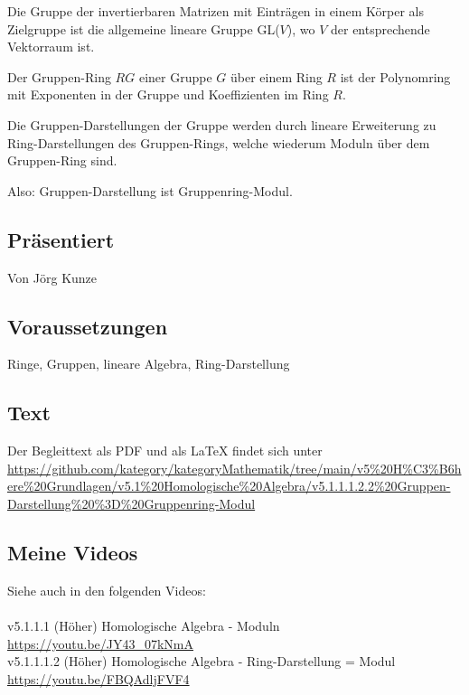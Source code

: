 \documentclass[a4paper]{amsart}
\theoremstyle{definition}
\begin{document}
Die Gruppe der invertierbaren Matrizen mit Einträgen in einem Körper als Zielgruppe ist die allgemeine lineare Gruppe GL($V$), wo $V$ der entsprechende Vektorraum ist.

Der Gruppen-Ring $RG$ einer Gruppe $G$ über einem Ring $R$ ist der Polynomring mit Exponenten in der Gruppe und Koeffizienten im Ring $R$.

Die Gruppen-Darstellungen der Gruppe werden durch lineare Erweiterung zu Ring-Darstellungen des Gruppen-Rings, welche wiederum Moduln über dem Gruppen-Ring sind. 

Also: Gruppen-Darstellung ist Gruppenring-Modul.

\subsection*{Präsentiert}
Von Jörg Kunze

\subsection*{Voraussetzungen}
Ringe, Gruppen, lineare Algebra, Ring-Darstellung

\subsection*{Text}
Der Begleittext als PDF und als LaTeX findet sich unter
{\tiny
   \url{https://github.com/kategory/kategoryMathematik/tree/main/v5%20H%C3%B6here%20Grundlagen/v5.1%20Homologische%20Algebra/v5.1.1.1.2.2%20Gruppen-Darstellung%20%3D%20Gruppenring-Modul}
}

\subsection*{Meine Videos}
Siehe auch in den folgenden Videos:\\
\\
v5.1.1.1 (Höher) Homologische Algebra - Moduln\\
\url{https://youtu.be/JY43_07kNmA}
\\
v5.1.1.1.2 (Höher) Homologische Algebra - Ring-Darstellung = Modul\\
\url{https://youtu.be/FBQAdljFVF4}
\end{document}
